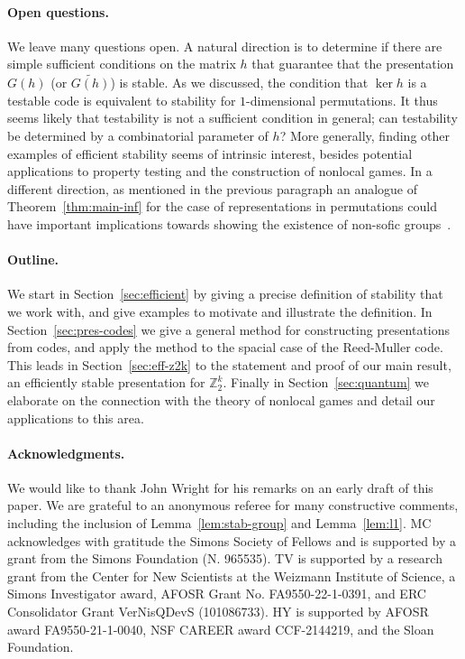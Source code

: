 \documentclass[11pt]{article}
\theoremstyle{definition}
\newcommand{\Z}{\ensuremath{\mathbb{Z}}}
\begin{document}
\paragraph{Open questions.}
We leave many questions open. A natural direction is to determine if there are simple sufficient conditions on the matrix $h$ that guarantee that the presentation $G(h)$ (or $\widetilde{G(h)}$) is stable. As we discussed, the condition that $\ker h$ is a testable code is equivalent to stability for $1$-dimensional permutations. It thus seems likely that testability is not a sufficient condition in general; can testability be determined by a combinatorial parameter of $h$? More generally, finding other examples of efficient stability seems of intrinsic interest, besides potential applications to property testing and the construction of nonlocal games. In a different direction, as mentioned in the previous paragraph an analogue of Theorem~\ref{thm:main-inf} for the case of representations in permutations could have important implications towards showing the existence of non-sofic groups~\cite{CL_part1,CL_part2,BCLV_subgroup_tests}.


\paragraph{Outline.}
We start in Section~\ref{sec:efficient} by giving a precise definition of stability that we work with, and give examples to motivate and illustrate the definition. In Section~\ref{sec:pres-codes} we give a general method for constructing presentations from codes, and apply the method to the spacial case of the Reed-Muller code. This leads in Section~\ref{sec:eff-z2k} to the statement and proof of our main result, an efficiently stable presentation for $\Z_2^k$. Finally in Section~\ref{sec:quantum} we elaborate on the connection with the theory of nonlocal games and detail our applications to this area. 




\paragraph{Acknowledgments.} 
We would like to thank John Wright for his remarks on an early draft of this paper. We are grateful to an anonymous referee for many constructive comments, including the inclusion of Lemma~\ref{lem:stab-group} and Lemma~\ref{lem:l1}. 
MC acknowledges with gratitude the Simons Society of Fellows and is supported by a grant from the Simons Foundation (N. 965535). 
TV is supported by a research grant from the Center for New Scientists at the Weizmann Institute of Science, a Simons Investigator award, AFOSR Grant No. FA9550-22-1-0391, and ERC Consolidator Grant VerNisQDevS (101086733). HY is supported by AFOSR award FA9550-21-1-0040, NSF CAREER award CCF-2144219, and the Sloan Foundation.
\end{document}
